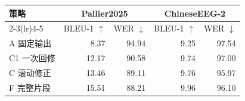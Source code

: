 \begingroup
\papertablestyle
\begin{tabular}{@{}lrrrr@{}}
\toprule
策略 & \multicolumn{2}{c}{Pallier2025} & \multicolumn{2}{c}{ChineseEEG-2} \\
\cmidrule(lr){2-3}\cmidrule(lr){4-5}
 & BLEU-1 $\uparrow$ & WER $\downarrow$ & BLEU-1 $\uparrow$ & WER $\downarrow$ \\
\midrule
A 固定输出 & 8.37 & 94.94 & 9.25 & 97.54 \\
C1 一次回修 & 12.17 & 90.58 & 9.74 & 97.00 \\
C 滚动修正 & 13.46 & 89.11 & 9.76 & 95.97 \\
F 完整片段 & 15.51 & 88.21 & 9.96 & 96.10 \\
\bottomrule
\end{tabular}
\endgroup
